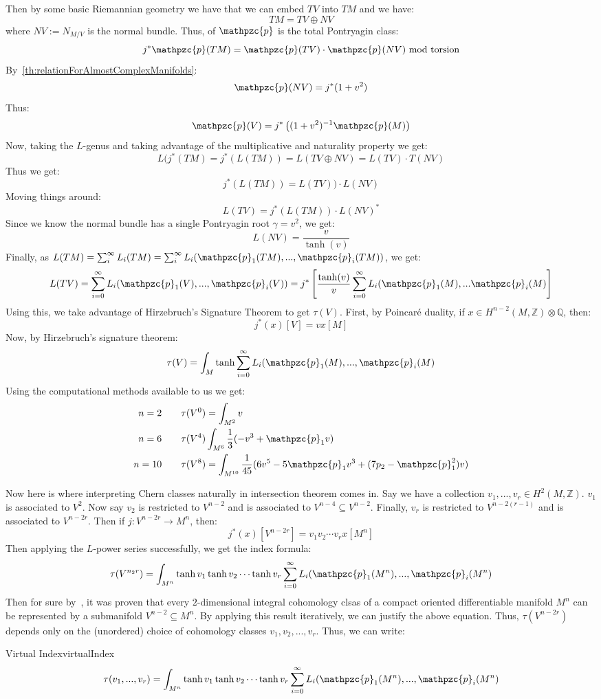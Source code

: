 \documentclass{book}
\newcommand{\Q}{{\mathbb{Q}}}
\newcommand{\Z}{{\mathbb{Z}}}
\newcommand{\cp}{{\mathpzc{p}}}
\newcommand{\sse}{\subseteq}
\renewcommand{\mod}{\,\operatorname{mod}\,}
\begin{document}
Then by some basic Riemannian geometry we have that we can embed $TV$ into $TM$ and we have:
\[
  TM = TV \oplus NV
\]
where $NV := N_{M/V}$ is the normal bundle. Thus, of $\cp$ is the total Pontryagin class:
\[
  j^*\cp(TM) = \cp(TV)\cdot \cp(NV) \mod\text{torsion}
\]
By~\cref{th:relationForAlmostComplexManifolds}:
\[
  \cp(NV) = j^*(1+v^2)
\]
Thus:
\[
  \cp(V) = j^*\left((1+v^2)^{-1} \cp(M)\right)
\]
Now, taking the $L$-genus and taking advantage of the multiplicative and naturality property we get:
\[
 L(j^*(TM) = j^*(L(TM)) = L(TV\oplus NV) = L(TV)\cdot T(NV)
\]
Thus we get:
\[
  j^*(L(TM)) = L(TV)) \cdot L(NV)
\]
Moving things around:
\[
  L(TV) = j^*(L(TM))\cdot L(NV)^*
\]
Since we know the normal bundle has a single Pontryagin root $\gamma = v^2$, we get:
\[
  L(NV) = \frac{v}{\tanh(v)}
\]
Finally, as $L(TM) = \sum_i^\infty L_i(TM) = \sum_i^\infty L_i(\cp_1(TM), ..., \cp_i(TM))$, we get:
\[
  L(TV) = \sum_{i=0}^\infty L_i(\cp_1(V), ..., \cp_i(V)) = j^* \left[ \frac{\tanh(v)}{v} \sum_{i=0}^\infty
  L_i(\cp_1(M), ... \cp_i(M)\right]
\]
Using this, we take advantage of Hirzebruch's Signature Theorem to get $\tau(V)$. First, by Poincar\'e
duality, if $x \in H^{n-2}(M, \Z)\otimes \Q$, then:
\[
  j^*(x)[V] = vx[M]
\]
Now, by Hirzebruch's signature theorem:
\[
  \tau(V) = \int_M \tanh \sum_{i=0}^\infty L_i(\cp_1(M), ..., \cp_i(M)
\]
Using the computational methods available to us we get:
\begin{align*}
  n = 2 \qquad& \tau(V^0) = \int_{M^2} v\\
  n = 6 \qquad& \tau(V^4) \int_{M^6} \frac{1}{3}(-v^3 + \cp_1v)\\
  n = 10 \qquad& \tau(V^8) = \int_{M^{10}} \frac{1}{45} (6v^5 - 5\cp_1 v^3 + (7p_2 - \cp_1^2)v)\\
\end{align*}

Now here is where interpreting Chern classes naturally in intersection theorem comes in. Say we have
a collection $v_1, ..., v_r \in H^2(M, \Z)$. $v_1$ is associated to $V^2$. Now say $v_2$ is restricted to $V^{n-2}$ and
is associated to $V^{n-4} \sse V^{n-2}$. Finally, $v_r$ is restricted to $V^{n-2(r-1)}$ and is associated to
$V^{n-2r}$. Then if $j: V^{n-2r} \to M^n$, then:
\[
  j^*(x)[V^{n-2r}] = v_1v_2\cdots v_rx[M^n]
\]
Then applying the $L$-power series successfully, we get the index formula:
\[
  \tau(V^{n_2r}) = \int_{M^n} \tanh v_1\tanh v_2 \cdots \tanh v_r \sum_{i=0}^\infty L_i(\cp_1(M^n), ...,
  \cp_i(M^n)
\]
Then for sure by~\cite{NateKTheory}, it was proven that every $2$-dimensional integral cohomology clsas of
a compact oriented differentiable manifold $M^n$ can be represented by a submanifold $V^{n-2} \sse M^n$. By
applying this result iteratively, we can justify the above equation. Thus, $\tau(V^{n-2r})$ depends only on
the (unordered) choice of cohomology classes $v_1,v_2, ..., v_r$. Thus, we can write:
\begin{defn}{Virtual Index}{virtualIndex}
\[
  \tau(v_1, ..., v_r) = \int_{M^n} \tanh v_1\tanh v_2 \cdots \tanh v_r \sum_{i=0}^\infty L_i(\cp_1(M^n), ...,
  \cp_i(M^n)
\]
\end{defn}
\end{document}
